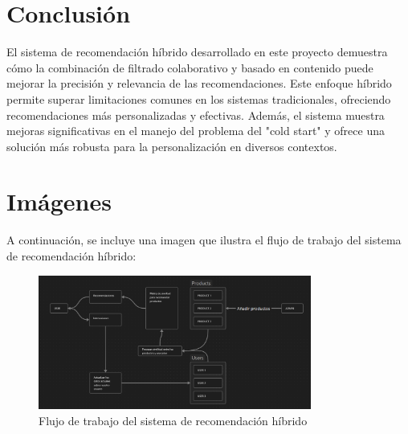 \documentclass{llncs}
\begin{document}
\section{Conclusión}
El sistema de recomendación híbrido desarrollado en este proyecto demuestra cómo la combinación de filtrado colaborativo y basado en contenido puede mejorar la precisión y relevancia de las recomendaciones. Este enfoque híbrido permite superar limitaciones comunes en los sistemas tradicionales, ofreciendo recomendaciones más personalizadas y efectivas. Además, el sistema muestra mejoras significativas en el manejo del problema del "cold start" y ofrece una solución más robusta para la personalización en diversos contextos.

\section{Imágenes}
A continuación, se incluye una imagen que ilustra el flujo de trabajo del sistema de recomendación híbrido:

\begin{figure}[ht]
\centering
\includegraphics[width=0.8\textwidth]{workflow.png}
\caption{Flujo de trabajo del sistema de recomendación híbrido}
\label{fig:workflow}
\end{figure}
\end{document}
